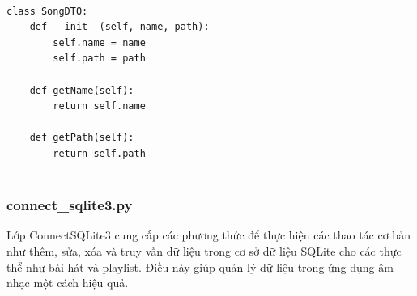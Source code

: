 \documentclass[a4paper]{article}
\begin{document}
\begin{mdframed}[hidealllines=true,backgroundcolor=magenta!10]
\begin{lstlisting}

class SongDTO:
    def __init__(self, name, path):
        self.name = name
        self.path = path

    def getName(self):
        return self.name

    def getPath(self):
        return self.path


\end{lstlisting}
\end{mdframed}

\subsubsection{connect\_sqlite3.py}
Lớp ConnectSQLite3 cung cấp các phương thức để thực hiện các thao tác cơ bản như thêm, sửa, xóa và truy vấn dữ liệu trong cơ sở dữ liệu SQLite cho các thực thể như bài hát và playlist. Điều này giúp quản lý dữ liệu trong ứng dụng âm nhạc một cách hiệu quả.
\end{document}
